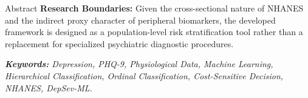 \documentclass{uetgraduation}
\begin{document}
\begin{preamble}{Abstract}
\textbf{Research Boundaries:} Given the cross-sectional nature of NHANES and the indirect proxy character of peripheral biomarkers, the developed framework is designed as a population-level risk stratification tool rather than a replacement for specialized psychiatric diagnostic procedures.

\vspace{0.6cm}
\noindent \textit{\textbf{Keywords:} Depression, PHQ-9, Physiological Data, Machine Learning, Hierarchical Classification, Ordinal Classification, Cost-Sensitive Decision, NHANES, DepSev-ML.}
\end{preamble}

\begin{contentlisting}
\tableofcontents
\listoffigures
\listoftables


\end{contentlisting}
\end{document}
